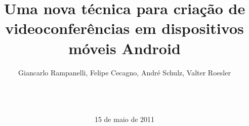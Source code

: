 \documentclass{acm_proc_article-sp}
\begin{document}
\title{Uma nova técnica para criação de videoconferências em dispositivos móveis Android}
%
%
%
%
%

%
\author{
%
%
Giancarlo Rampanelli, 
Felipe Cecagno,
André Schulz,
Valter Roesler\\
       \\
       \\
       \\
}
\date{15 de maio de 2011}
\end{document}

